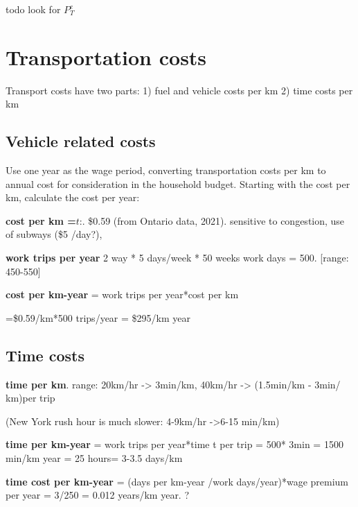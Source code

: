todo look for $P^e_T$ 

  
    
    
    
 

\section{Transportation costs}
Transport costs have two parts:
1) fuel and vehicle costs per km
2) time costs per km

\subsection{Vehicle related costs}
Use one year as the wage period, converting transportation costs per km to annual cost for consideration in the household budget. Starting with the cost per km, calculate the cost per year:

\textbf{cost per km =$\textit{t}$}:. \$0.59   (from  Ontario data, 2021). sensitive to congestion, use of subways (\$5 /day?), 

 \textbf{work trips per year} 2 way * 5 days/week * 50 weeks work days = 500. [range: 450-550]

\textbf{cost per km-year} = work trips per year*cost per km

=\$0.59/km*500 trips/year  =  \$295/km year 



\subsection{Time costs}
\textbf{time per km}. range: 20km/hr -> 3min/km, 40km/hr -> (1.5min/km - 3min/ km)per trip 

(New York rush hour is much slower:  4-9km/hr ->6-15 min/km)

\textbf{time  per km-year} = work trips per year*time t per trip = 500* 3min  = 1500 min/km year = 25 hours= 3-3.5 days/km
 
\textbf{time cost per km-year} =  (days per km-year /work days/year)*wage premium per year  = 3/250 = 0.012 years/km year. ?


